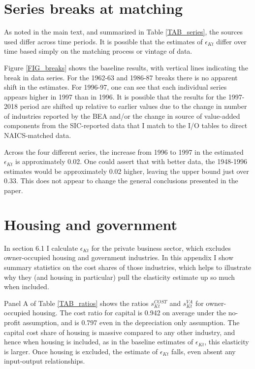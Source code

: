 \documentclass[11pt]{article}
\begin{document}
\section{Series breaks at matching}
As noted in the main text, and summarized in Table \ref{TAB_series}, the sources used differ across time periods. It is possible that the estimates of $\epsilon_{Kt}$ differ over time based simply on the matching process or vintage of data. 

Figure \ref{FIG_breaks} shows the baseline results, with vertical lines indicating the break in data series. For the 1962-63 and 1986-87 breaks there is no apparent shift in the estimates. For 1996-97, one can see that each individual series appears higher in 1997 than in 1996. It is possible that the results for the 1997-2018 period are shifted up relative to earlier values due to the change in number of industries reported by the BEA and/or the change in source of value-added components from the SIC-reported data that I match to the I/O tables to direct NAICS-matched data. 

Across the four different series, the increase from 1996 to 1997 in the estimated $\epsilon_{Kt}$ is approximately 0.02. One could assert that with better data, the 1948-1996 estimates would be approximately 0.02 higher, leaving the upper bound just over 0.33. This does not appear to change the general conclusions presented in the paper. 

\section{Housing and government}
In section 6.1 I calculate $\epsilon_{Kt}$ for the private business sector, which excludes owner-occupied housing and government industries. In this appendix I show summary statistics on the cost shares of those industries, which helps to illustrate why they (and housing in particular) pull the elasticity estimate up so much when included. 

Panel A of Table \ref{TAB_ratios} shows the ratios $s^{COST}_{Kt}$ and $s^{VA}_{Kt}$ for owner-occupied housing. The cost ratio for capital is 0.942 on average under the no-profit assumption, and is 0.797 even in the depreciation only assumption. The capital cost share of housing is massive compared to any other industry, and hence when housing is included, as in the baseline estimates of $\epsilon_{Kt}$, this elasticity is larger. Once housing is excluded, the estimate of $\epsilon_{Kt}$ falls, even absent any input-output relationships. 
\end{document}
